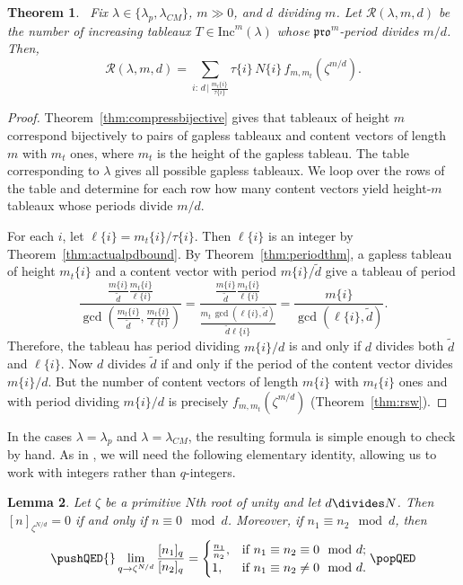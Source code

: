 \documentclass[12pt]{amsart}
\newtheorem{theorem}{Theorem}[section]
\newtheorem{lemma}[theorem]{Lemma}
\theoremstyle{definition}
\theoremstyle{remark}
\numberwithin{equation}{section}
\newcommand{\inc}{\ensuremath{\mathrm{Inc}}}
\newcommand{\pro}{\mathfrak{pro}}
\begin{document}
\begin{theorem}~\label{thm:mainresult}
Fix $\lambda \in \lbrace  \lambda_p, \lambda_{CM} \rbrace$, $m \gg 0$, and $d$ dividing $m$. Let $\mathcal{R}(\lambda,m,d)$ be the number of increasing tableaux $T \in \inc^m(\lambda)$ whose $\pro^m$-period divides $m/d$. Then,
\begin{equation}\label{eq:mainresulteq} 
\mathcal{R}(\lambda,m,d)  = \sum \limits_{i: \, d \, \vert \, \frac{m_t\{i\}}{\tau\{i\}}} \tau\{i\} \, N\{i\} \, f_{m,m_t}(\zeta^{m/d}).
\end{equation}
\end{theorem}
\begin{proof}
Theorem~\ref{thm:compressbijective} gives that tableaux of height $m$ correspond bijectively to pairs of gapless tableaux and content vectors of length $m$ with $m_t$ ones, where $m_t$ is the height of the gapless tableau. The table corresponding to $\lambda$ gives all possible gapless tableaux. We loop over the rows of the table and determine for each row how many content vectors yield height-$m$ tableaux whose periods divide $m/d$. 

For each $i$, let $\ell\{i\} = m_t\{i\}/\tau\{i\}$. Then $\ell\{i\}$ is an integer by Theorem~\ref{thm:actualpdbound}.  By Theorem~\ref{thm:periodthm}, a gapless tableau of height $m_t\{i\}$ and a content vector with period $m\{i\}/\tilde{d}$ give a tableau of period \[ \frac{\frac{m\{i\}}{\tilde{d}} \frac{m_t\{i\}}{\ell\{i\}}}{\gcd(\frac{m_t\{i\}}{\tilde{d}},\frac{m_t\{i\}}{\ell\{i\}})} = \frac{\frac{m\{i\}}{\tilde{d}} \frac{m_t\{i\}}{\ell\{i\}}}{\frac{m_t \, \gcd(\ell\{i\},\tilde{d})}{\tilde{d} \ell\{i\}}} = \frac{m\{i\}}{\gcd(\ell\{i\},\tilde{d})}. \] 
Therefore, the tableau has period dividing $m\{i\}/d$ is and only if $d$ divides both $\tilde{d}$ and $\ell\{i\}$. Now $d$ divides $\tilde{d}$ if and only if the period of the content vector divides $m\{i\}/d$. But the number of content vectors of length $m\{i\}$ with $m_t\{i\}$ ones and with period dividing $m\{i\}/d$ is precisely $f_{m,m_t}(\zeta^{m/d})$ (Theorem~\ref{thm:rsw}).
\end{proof}

In the cases $\lambda = \lambda_p$ and $\lambda = \lambda_{CM}$, the resulting formula is simple enough to check by hand. As in \cite[Proof of Theorem 7.1]{Reiner.Stanton.White}, we will need the following elementary identity, allowing us to work with integers rather than $q$-integers. 


\begin{lemma}\label{lem:evalq}
Let $\zeta$ be a primitive $N$th root of unity and let $d \divides N$. Then $[n]_{\zeta^{N/d}} = 0$ if and only if $n \equiv 0 \mod d$. Moreover, if $n_1 \equiv n_2 \mod d$, then 
\begin{equation}\label{eq:evalq}
\pushQED{\qed}
\lim \limits_{q \rightarrow \zeta^{N/d}} \frac{[n_1]_q}{[n_2]_q} = 
\begin{cases}
\frac{n_1}{n_2}, &\text{if }  n_1 \equiv n_2 \equiv 0 \mod d; \\
1, &\text{if } n_1 \equiv n_2 \neq 0 \mod d.
\end{cases} \qedhere \popQED
\end{equation}
\end{lemma}
\end{document}
